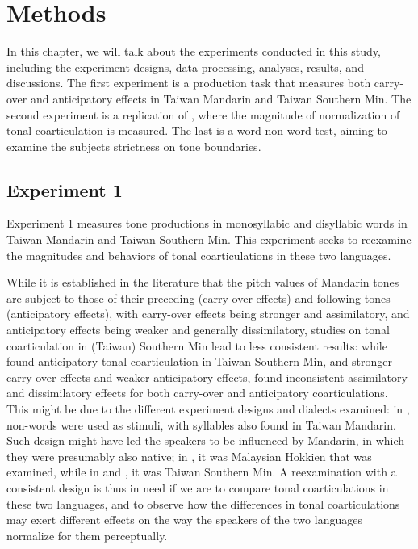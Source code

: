 \chapter{Methods}

In this chapter, we will talk about the experiments conducted in this study, including the experiment designs, data processing, analyses, results, and discussions. The first experiment is a production task that measures both carry-over and anticipatory effects in Taiwan Mandarin and Taiwan Southern Min. The second experiment is a replication of \cite{Zhangetal2022}, where the magnitude of normalization of tonal coarticulation is measured. The last is a word-non-word test, aiming to examine the subjects strictness on tone boundaries.


\section{Experiment 1}
Experiment 1 measures tone productions in monosyllabic and disyllabic words in Taiwan Mandarin and Taiwan Southern Min. This experiment seeks to reexamine the magnitudes and behaviors of tonal coarticulations in these two languages.

While it is established in the literature that the pitch values of Mandarin tones are subject to those of their preceding (carry-over effects) and following tones (anticipatory effects), with carry-over effects being stronger and assimilatory, and anticipatory effects being weaker and generally dissimilatory, studies on tonal coarticulation in (Taiwan) Southern Min lead to less consistent results: while \cite{Peng1997} found anticipatory tonal coarticulation in Taiwan Southern Min, and \cite{Wang2002} stronger carry-over effects and weaker anticipatory effects, \cite{ChangHsieh2012} found inconsistent assimilatory and dissimilatory effects for both carry-over and anticipatory coarticulations. This might be due to the different experiment designs and dialects examined: in \cite{Wang2002}, non-words were used as stimuli, with syllables also found in Taiwan Mandarin. Such design might have led the speakers to be influenced by Mandarin, in which they were presumably also native; in \cite{ChangHsieh2012}, it was Malaysian Hokkien that was examined, while in \cite{Peng1997} and \cite{Wang2002}, it was Taiwan Southern Min. A reexamination with a consistent design is thus in need if we are to compare tonal coarticulations in these two languages, and to observe how the differences in tonal coarticulations may exert different effects on the way the speakers of the two languages normalize for them perceptually.

